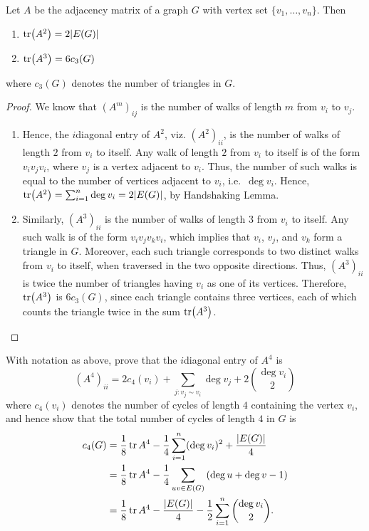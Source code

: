 \begin{Theorem}
Let $A$ be the adjacency matrix of a graph $G$ with vertex set $\{v_1, \ldots, v_n\}$. Then
\begin{enumerate}[label=(\roman*)]
\item $\tr(A^2) = 2 |E(G)|$
\item $\tr(A^3) = 6 c_3(G)$
\end{enumerate}
where $c_3(G)$ denotes the number of triangles in $G$.
\end{Theorem}

\begin{proof}
We know that $(A^m)_{ij}$ is the number of walks of length $m$ from $v_i$ to $v_j$.
\begin{enumerate}[label=(\roman*)]
\item Hence, the $i$\nth diagonal entry of $A^2$, viz. $(A^2)_{ii}$, is the number of walks of length $2$ from $v_i$ to itself. Any walk of length $2$ from $v_i$ to itself is of the form $v_i v_j v_i$, where $v_j$ is a vertex adjacent to $v_i$. Thus, the number of such walks is equal to the number of vertices adjacent to $v_i$, i.e.\ $\deg v_i$. Hence, $\tr(A^2) = \sum_{i=1}^n \deg v_i = 2|E(G)|$, by Handshaking Lemma.

\item Similarly, $(A^3)_{ii}$ is the number of walks of length $3$ from $v_i$ to itself. Any such walk is of the form $v_i v_j v_k v_i$, which implies that $v_i$, $v_j$, and $v_k$ form a triangle in $G$. Moreover, each such triangle corresponds to two distinct walks from $v_i$ to itself, when traversed in the two opposite directions. Thus, $(A^3)_{ii}$ is twice the number of triangles having $v_i$ as one of its vertices. Therefore, $\tr(A^3)$ is $6 c_3(G)$, since each triangle contains three vertices, each of which counts the triangle twice in the sum $\tr(A^3)$. \qedhere
\end{enumerate}
\end{proof}

\begin{Exercise}
With notation as above, prove that the $i$\nth diagonal entry of $A^4$ is
\begin{equation*}
	(A^4)_{ii} = 2c_4(v_i) + \sum_{j \colon v_j \sim v_i} \deg v_j + 2 \binom{\deg v_i}{2}
\end{equation*}
where $c_4(v_i)$ denotes the number of cycles of length $4$ containing the vertex $v_i$, and hence show that the total number of cycles of length $4$ in $G$ is
\begin{align*}
	c_4(G) & = \frac 1 8 \tr A^4 - \frac 1 4 \sum_{i=1}^{n} (\deg v_i)^2 + \frac{|E(G)|}{4} \\
	& = \frac 1 8 \tr A^4 - \frac 1 4 \sum_{uv \in E(G)} \pqty{\deg u + \deg v - 1} \\
	& = \frac 1 8 \tr A^4 - \frac {|E(G)|} 4 - \frac 1 2 \sum_{i=1}^n \binom {\deg v_i} 2.
\end{align*}
\end{Exercise}



